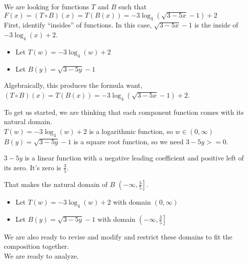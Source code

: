 \documentclass{ximera}
\begin{document}
\begin{idea}

\begin{center}
\end{center}









We are looking for functions $T$ and $B$ such that $F(x) = (T \circ B)(x) = T(B(x)) = -3 \log_4(\sqrt{3 - 5x} - 1) + 2$ \\


First, identify ``insides'' of functions.  In this case, $\sqrt{3 - 5x} - 1$ is the inside of $-3 \log_4(x) + 2$. \\



\begin{itemize}
\item Let $T(w) = -3 \log_4(w) + 2$ \\
\item Let $B(y) = \sqrt{3 - 5y} - 1$ \\
\end{itemize}

Algebraically, this produces the formula want,  $(T \circ B)(x) = T(B(x)) = -3 \log_4(\sqrt{3 - 5x} - 1) + 2$.


To get us started, we are thinking that each component function comes with its natural domain. \\


$T(w) = -3 \log_4(w) + 2$ is a logarithmic function, so $w \in (0, \infty)$ \\


$B(y) = \sqrt{3 - 5y} - 1$ is a square root function, so we need $3 - 5y >= 0$.

$3 - 5y$ is a linear function with a negative leading coefficient and positive left of its zero.  It's zero is $\frac{3}{5}$.

That makes the natural domain of $B$ $\left(-\infty, \frac{3}{5} \right]$. \\



\begin{itemize}
\item Let $T(w) = -3 \log_4(w) + 2$ with domain $(0, \infty)$\\
\item Let $B(y) = \sqrt{3 - 5y} - 1$ with domain $\left(-\infty, \frac{3}{5} \right]$\\
\end{itemize}

We are also ready to revise and modify and restrict these domains to fit the composition together. \\




We are ready to analyze. \\


\end{idea}
\end{document}
